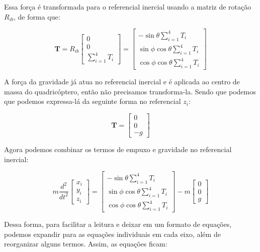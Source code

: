 Essa força é transformada para o referencial inercial usando a matriz de rotação $R_{ib}$, de forma que:

\begin{equation}
\mathbf{T} = R_{ib} \begin{bmatrix} 
0 \\
0 \\
\sum_{i=1}^{4} T_i 
\end{bmatrix} = 
\begin{bmatrix} 
-\sin\theta \sum_{i=1}^{4} T_i \\
\sin\phi \cos\theta \sum_{i=1}^{4} T_i \\
\cos\phi \cos\theta \sum_{i=1}^{4} T_i
\end{bmatrix}
\end{equation}

A força da gravidade já atua no referencial inercial e é aplicada ao centro de massa do quadricóptero, então não precisamos transforma-la. Sendo que podemos que podemos expressa-lá da seguinte forma no referencial $z_i$:

\begin{equation}
\mathbf{T} = \begin{bmatrix}
0 \\
0 \\
-g
\end{bmatrix}
\end{equation}

Agora podemos combinar os termos de empuxo e gravidade no referencial inercial:

\begin{equation}
m \frac{d^2}{dt^2} \begin{bmatrix} 
x_i \\ 
y_i \\ 
z_i 
\end{bmatrix}
=
\begin{bmatrix} 
-\sin\theta \sum_{i=1}^{4} T_i \\
\sin\phi \cos\theta \sum_{i=1}^{4} T_i \\
\cos\phi \cos\theta \sum_{i=1}^{4} T_i
\end{bmatrix}
- m \begin{bmatrix}
0 \\
0 \\
g
\end{bmatrix}
\end{equation}

Dessa forma, para facilitar a leitura e deixar em um formato de equações, podemos expandir para as equações individuais em cada eixo, além de reorganizar alguns termos. Assim, as equações ficam:


